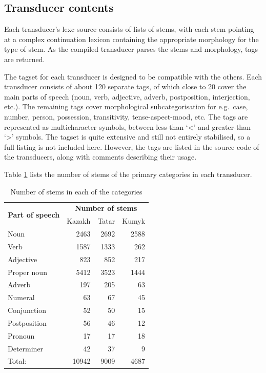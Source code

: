 \documentclass[a4paper,11pt,twocolumn]{article}
\begin{document}

\subsection{Transducer contents}

Each transducer's lexc source consists of lists of stems, with each stem pointing at a complex continuation lexicon containing the appropriate morphology for the type of stem.  As the compiled transducer parses the stems and morphology, tags are returned.

The tagset for each transducer is designed to be compatible with the others.  Each transducer consists of about 120 separate tags, of which close to 20 cover the main parts of speech (noun, verb, adjective, adverb, postposition, interjection, etc.).  The remaining tags cover morphological subcategorisation for e.g.\ case, number, person, possession, transitivity, tense-aspect-mood, etc.  The tags are represented as multicharacter symbols, between less-than `<' and greater-than `>' symbols.  The tagset is quite extensive and still not entirely stabilised, so a full listing is not included here.  However, the tags are listed in the source code of the transducers, along with comments describing their usage.


Table \ref{table:stems} lists the number of stems of the primary categories in each transducer.

\begin{table}
\begin{center}
\begin{tabular}{lrrr}
		\toprule
\multirow{2}{*}{\textbf{Part of speech}} & \multicolumn{3}{c}{\textbf{Number of stems}} \\ \cline{2-4}
                        & Kazakh & Tatar & Kumyk \\
		\midrule
		Noun & 2463 & 2692 & 2588 \\
		Verb & 1587 & 1333 & 262 \\
		Adjective & 823 & 852 & 217 \\
		Proper noun & 5412 & 3523 & 1444 \\
		Adverb & 197 & 205 & 63 \\
		Numeral & 63 & 67 & 45 \\
		Conjunction & 52 & 50 & 15 \\
		Postposition & 56 & 46 & 12 \\
		Pronoun & 17 & 17 & 18 \\
		Determiner & 42 & 37 & 9 \\
		\midrule
		Total: & 10942 & 9009 & 4687 \\
		\bottomrule
\end{tabular}
 \caption{Number of stems in each of the categories}
 \label{table:stems}
\end{center}

\end{table}
\end{document}
